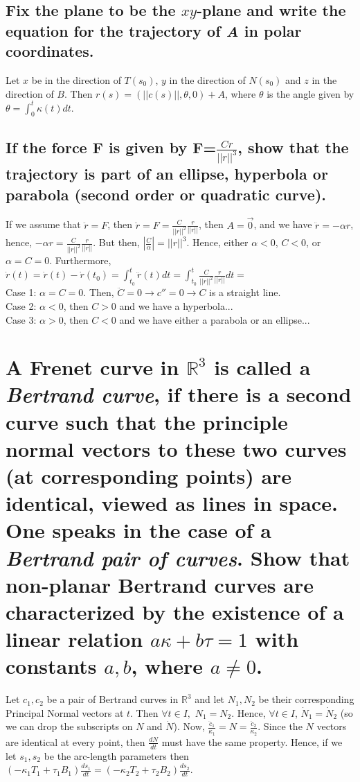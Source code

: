 \documentclass[12pt]{amsart}
\begin{document}
\subsection{Fix the plane to be the $xy$-plane and write the equation for the trajectory of \emph{A} in polar coordinates.}
Let $x$ be in the direction of $T(s_0)$, $y$ in the direction of $N(s_0)$ and $z$ in the direction of $B$. Then $r(s)=(||c(s)||,\theta,0)+A$, where $\theta$ is the angle given by $\theta=\int_0^t\kappa(t)dt$.

\subsection{If the force \textbf{F} is given by \textbf{F}=$\frac{Cr}{||r||^3}$, show that the trajectory is part of an ellipse, hyperbola or parabola (second order or quadratic curve).}
If we assume that $\ddot r=F$, then $\ddot r=F=\frac{C}{||r||^2}\frac{r}{||r||}$, then $A=\vec0$, and we have $\ddot r=-\alpha r$, hence, $-\alpha r=\frac{C}{||r||^2}\frac{r}{||r||}$. But then, $\left|\frac{C}{\alpha}\right|=||r||^3$. Hence, either $\alpha<0$, $C<0$, or $\alpha=C=0$. Furthermore, $\dot r(t)=\dot r(t)-\dot r(t_0)=\int_{t_0}^t\ddot r(t)dt=\int_{t_0}^t\frac{C}{||r||^2}\frac{r}{||r||}dt=$
\\Case 1: $\alpha=C=0$. Then, $\ddot C=0\rightarrow c''=0\rightarrow C$ is a straight line.
\\Case 2: $\alpha<0$, then $C>0$ and we have a hyperbola...
\\Case 3: $\alpha>0$, then $C<0$ and we have either a parabola or an ellipse...

\setcounter{equation}{0}
\newpage%
\section{A Frenet curve in $\mathbb{R}^3$ is called a \emph{Bertrand curve}, if there is a second curve such that the principle normal vectors to these two curves (at corresponding points) are identical, viewed as lines in space. One speaks in the case of a \emph{Bertrand pair of curves}. Show that non-planar Bertrand curves are characterized by the existence of a linear relation $a\kappa+b\tau=1$ with constants $a,b$, where $a\neq0$.} Let $c_1,c_2$ be a pair of Bertrand curves in $\mathbb{R}^3$ and let $N_1,N_2$ be their corresponding Principal Normal vectors at $t$. Then $\forall t\in I,$ $N_1=N_2$. Hence, $\forall t\in I$, $\dot N_1=\dot N_2$ (so we can drop the subscripts on $N$ and $\dot N$). Now, $\frac{\ddot c_1}{\kappa_1}=N=\frac{\ddot c_2}{\kappa_2}$. Since the $N$ vectors are identical at every point, then $\frac{dN}{dt}$ must have the same property. Hence, if we let $s_1,s_2$ be the arc-length parameters then $(-\kappa_1T_1+\tau_1B_1)\frac{ds_1}{dt}=(-\kappa_2T_2+\tau_2B_2)\frac{ds_2}{dt}$.
\end{document}
